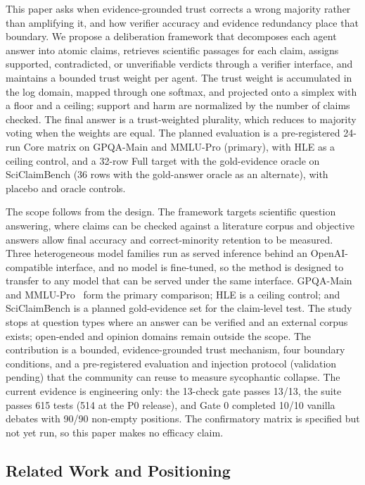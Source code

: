 \documentclass[a4paper,fleqn]{cas-sc}
\begin{document}
This paper asks when evidence-grounded trust corrects a wrong majority rather than amplifying it, and how verifier accuracy and evidence redundancy place that boundary. We propose a deliberation framework that decomposes each agent answer into atomic claims, retrieves scientific passages for each claim, assigns supported, contradicted, or unverifiable verdicts through a verifier interface, and maintains a bounded trust weight per agent. The trust weight is accumulated in the log domain, mapped through one softmax, and projected onto a simplex with a floor and a ceiling; support and harm are normalized by the number of claims checked. The final answer is a trust-weighted plurality, which reduces to majority voting when the weights are equal. The planned evaluation is a pre-registered 24-run Core matrix on GPQA-Main and MMLU-Pro (primary), with HLE as a ceiling control, and a 32-row Full target with the gold-evidence oracle on SciClaimBench (36 rows with the gold-answer oracle as an alternate), with placebo and oracle controls.

The scope follows from the design. The framework targets scientific question answering, where claims can be checked against a literature corpus and objective answers allow final accuracy and correct-minority retention to be measured. Three heterogeneous model families run as served inference behind an OpenAI-compatible interface, and no model is fine-tuned, so the method is designed to transfer to any model that can be served under the same interface. GPQA-Main~\cite{rein2024gpqa} and MMLU-Pro~\cite{wang2024mmlupro} form the primary comparison; HLE is a ceiling control; and SciClaimBench is a planned gold-evidence set for the claim-level test. The study stops at question types where an answer can be verified and an external corpus exists; open-ended and opinion domains remain outside the scope. The contribution is a bounded, evidence-grounded trust mechanism, four boundary conditions, and a pre-registered evaluation and injection protocol (validation pending) that the community can reuse to measure sycophantic collapse. The current evidence is engineering only: the 13-check gate passes 13/13, the suite passes 615 tests (514 at the P0 release), and Gate 0 completed 10/10 vanilla debates with 90/90 non-empty positions. The confirmatory matrix is specified but not yet run, so this paper makes no efficacy claim.

\subsection{Related Work and Positioning}
\end{document}
